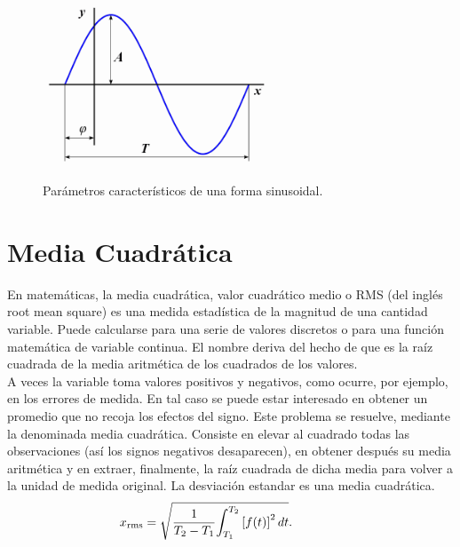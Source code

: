 \documentclass{article}
\begin{document}
\begin{figure}
    \centering
    \includegraphics[width=0.6\textwidth]{Imagenes/Alg_sinusoide.png}
    \caption{Parámetros característicos de una forma sinusoidal.}
    \label{fig:parametro_sinusoide}
\end{figure}
 
 
 \section{Media Cuadrática}
 
 En matemáticas, la media cuadrática, valor cuadrático medio o RMS (del inglés root mean square) es una medida estadística de la magnitud de una cantidad variable. Puede calcularse para una serie de valores discretos o para una función matemática de variable continua. El nombre deriva del hecho de que es la raíz cuadrada de la media aritmética de los cuadrados de los valores.\citep{MediaCuadratica}\\

A veces la variable toma valores positivos y negativos, como ocurre, por ejemplo, en los errores de medida. En tal caso se puede estar interesado en obtener un promedio que no recoja los efectos del signo. Este problema se resuelve, mediante la denominada media cuadrática. Consiste en elevar al cuadrado todas las observaciones (así los signos negativos desaparecen), en obtener después su media aritmética y en extraer, finalmente, la raíz cuadrada de dicha media para volver a la unidad de medida original. La desviación estandar es una media cuadrática.\citep{MediaCuadratica}\\

\begin{equation}
    x_{\mathrm{rms}} = \sqrt {{1 \over {T_2 - T_1}} {\int_{T_1}^{T_2} {[f(t)]}^2\, dt}}. \qquad\qquad 
\end{equation}

\end{document}
